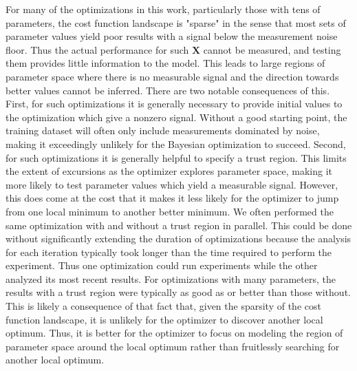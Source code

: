 \documentclass{article}
\begin{document}
For many of the optimizations in this work, particularly those with tens of parameters, the cost function landscape is "sparse" in the sense that most sets of parameter values yield poor results with a signal below the measurement noise floor. Thus the actual performance for such $\mathbf{X}$ cannot be measured, and testing them provides little information to the model. This leads to large regions of parameter space where there is no measurable signal and the direction towards better values cannot be inferred. There are two notable consequences of this. First, for such optimizations it is generally necessary to provide initial values to the optimization which give a nonzero signal. Without a good starting point, the training dataset will often only include measurements dominated by noise, making it exceedingly unlikely for the Bayesian optimization to succeed. Second, for such optimizations it is generally helpful to specify a trust region. This limits the extent of excursions as the optimizer explores parameter space, making it more likely to test parameter values which yield a measurable signal. However, this does come at the cost that it makes it less likely for the optimizer to jump from one local minimum to another better minimum. We often performed the same optimization with and without a trust region in parallel. This could be done without significantly extending the duration of optimizations because the analysis for each iteration typically took longer than the time required to perform the experiment. Thus one optimization could run experiments while the other analyzed its most recent results. For optimizations with many parameters, the results with a trust region were typically as good as or better than those without. This is likely a consequence of that fact that, given the sparsity of the cost function landscape, it is unlikely for the optimizer to discover another local optimum. Thus, it is better for the optimizer to focus on modeling the region of parameter space around the local optimum rather than fruitlessly searching for another local optimum.
\end{document}
